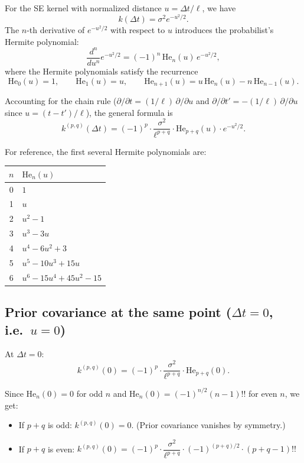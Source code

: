 \documentclass[11pt]{article}
\begin{document}
For the SE kernel with normalized distance $u = \Delta t / \ell$, we have
\[
k(\Delta t) = \sigma^2 e^{-u^2/2}.
\]
The $n$-th derivative of $e^{-u^2/2}$ with respect to $u$ introduces the probabilist's Hermite polynomial:
\[
\frac{d^n}{du^n} e^{-u^2/2} = (-1)^n\, \mathrm{He}_n(u)\, e^{-u^2/2},
\]
where the Hermite polynomials satisfy the recurrence
\[
\mathrm{He}_0(u) = 1, \qquad \mathrm{He}_1(u) = u, \qquad \mathrm{He}_{n+1}(u) = u\,\mathrm{He}_n(u) - n\,\mathrm{He}_{n-1}(u).
\]

Accounting for the chain rule ($\partial/\partial t = (1/\ell)\, \partial/\partial u$ and $\partial/\partial t' = -(1/\ell)\, \partial/\partial u$ since $u = (t-t')/\ell$), the general formula is
\begin{equation}
k^{(p,q)}(\Delta t) = (-1)^p \cdot \frac{\sigma^2}{\ell^{p+q}} \cdot \mathrm{He}_{p+q}(u) \cdot e^{-u^2/2}.
\label{eq:kernel-deriv}
\end{equation}

For reference, the first several Hermite polynomials are:
\begin{center}
\begin{tabular}{cl}
\toprule
$n$ & $\mathrm{He}_n(u)$ \\
\midrule
0 & $1$ \\
1 & $u$ \\
2 & $u^2 - 1$ \\
3 & $u^3 - 3u$ \\
4 & $u^4 - 6u^2 + 3$ \\
5 & $u^5 - 10u^3 + 15u$ \\
6 & $u^6 - 15u^4 + 45u^2 - 15$ \\
\bottomrule
\end{tabular}
\end{center}

\subsection{Prior covariance at the same point ($\Delta t = 0$, i.e.\ $u = 0$)}

At $\Delta t = 0$:
\[
k^{(p,q)}(0) = (-1)^p \cdot \frac{\sigma^2}{\ell^{p+q}} \cdot \mathrm{He}_{p+q}(0).
\]

Since $\mathrm{He}_n(0) = 0$ for odd $n$ and $\mathrm{He}_n(0) = (-1)^{n/2} (n-1)!!$ for even $n$, we get:

\begin{itemize}
\item If $p + q$ is odd: $k^{(p,q)}(0) = 0$. (Prior covariance vanishes by symmetry.)
\item If $p + q$ is even: $k^{(p,q)}(0) = (-1)^p \cdot \dfrac{\sigma^2}{\ell^{p+q}} \cdot (-1)^{(p+q)/2} \cdot (p+q-1)!!$
\end{itemize}
\end{document}

